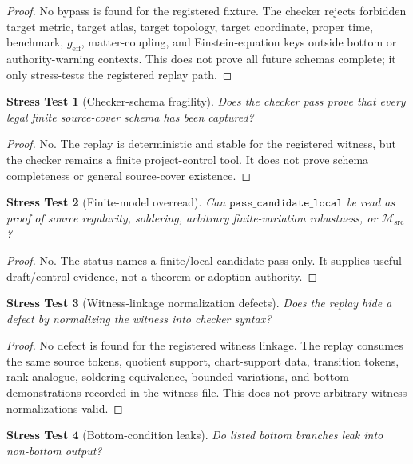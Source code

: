 \documentclass[11pt]{article}
\newcommand{\Msrc}{\mathcal{M}_{\mathrm{src}}}
\newcommand{\geff}{g_{\mathrm{eff}}}
\newtheorem{stress}{Stress Test}
\begin{document}
\begin{proof}
No bypass is found for the registered fixture. The checker rejects forbidden
target metric, target atlas, target topology, target coordinate, proper time,
benchmark, \(\geff\), matter-coupling, and Einstein-equation keys outside
bottom or authority-warning contexts. This does not prove all future schemas
complete; it only stress-tests the registered replay path.
\end{proof}

\begin{stress}[Checker-schema fragility]
Does the checker pass prove that every legal finite source-cover schema has
been captured?
\end{stress}

\begin{proof}
No. The replay is deterministic and stable for the registered witness, but the
checker remains a finite project-control tool. It does not prove schema
completeness or general source-cover existence.
\end{proof}

\begin{stress}[Finite-model overread]
Can \(\texttt{pass\_candidate\_local}\) be read as proof of source regularity,
soldering, arbitrary finite-variation robustness, or \(\Msrc\)?
\end{stress}

\begin{proof}
No. The status names a finite/local candidate pass only. It supplies useful
draft/control evidence, not a theorem or adoption authority.
\end{proof}

\begin{stress}[Witness-linkage normalization defects]
Does the replay hide a defect by normalizing the witness into checker syntax?
\end{stress}

\begin{proof}
No defect is found for the registered witness linkage. The replay consumes the
same source tokens, quotient support, chart-support data, transition tokens,
rank analogue, soldering equivalence, bounded variations, and bottom
demonstrations recorded in the witness file. This does not prove arbitrary
witness normalizations valid.
\end{proof}

\begin{stress}[Bottom-condition leaks]
Do listed bottom branches leak into non-bottom output?
\end{stress}
\end{document}
